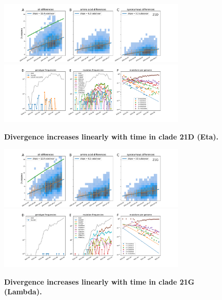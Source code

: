 \begin{figure}[h]
    \includegraphics[width=0.8\textwidth]{figures/rtt/21D_rtt.pdf}
    \includegraphics[width=0.8\textwidth]{figures/counts/21D_counts.pdf}
    \caption{{\bf Divergence increases linearly with time in clade 21D (Eta).}
    \label{fig:21D_divergence}}
\end{figure}

\begin{figure}[h]
    \includegraphics[width=0.8\textwidth]{figures/rtt/21G_rtt.pdf}
    \includegraphics[width=0.8\textwidth]{figures/counts/21H_counts.pdf}
    \caption{{\bf Divergence increases linearly with time in clade 21G (Lambda).}
    \label{fig:21G_divergence}}
\end{figure}

